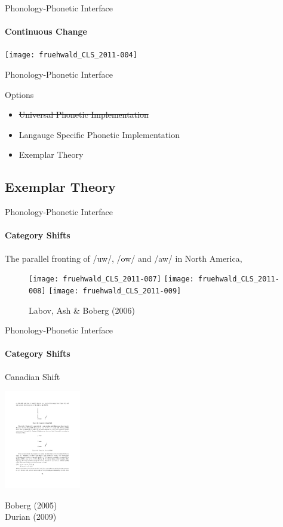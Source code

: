 \documentclass[]{beamer}
\begin{document}
\begin{frame}{Phonology-Phonetic Interface}
	\framesubtitle{Continuous Change}

\texttt{[image: fruehwald\_CLS\_2011-004]}
	
	
\end{frame}

\begin{frame}{Phonology-Phonetic Interface}

	\begin{block}{Options}
		\begin{itemize}
			\item \sout{Universal Phonetic Implementation}
			\item Langauge Specific Phonetic Implementation
			\item Exemplar Theory
		\end{itemize}
	\end{block}

\end{frame}

\subsection{Exemplar Theory}





\begin{frame}{Phonology-Phonetic Interface}
	\framesubtitle{Category Shifts}
	The parallel fronting of /uw/, /ow/ and /aw/ in North America,
\begin{figure}
\texttt{[image: fruehwald\_CLS\_2011-007]}
\texttt{[image: fruehwald\_CLS\_2011-008]}
\texttt{[image: fruehwald\_CLS\_2011-009]}

Labov, Ash \& Boberg (2006)

\end{figure}
\end{frame}




\begin{frame}{Phonology-Phonetic Interface}
	\framesubtitle{Category Shifts}
\begin{block}{Canadian Shift}
	\begin{center}
	\includegraphics[width = 0.25\textwidth]{figures/canshift.pdf}
	\end{center}
\end{block}
Boberg (2005)\\
Durian (2009)
\end{frame}
\end{document}
